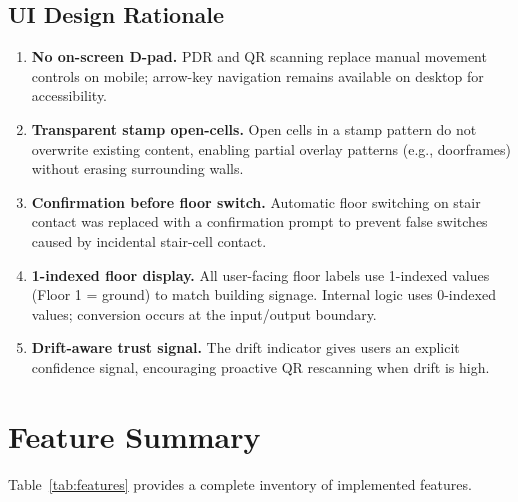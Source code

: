 \documentclass[12pt,a4paper]{article}
\begin{document}
\subsection{UI Design Rationale}

\begin{enumerate}[label=\textbf{D\arabic*.}, leftmargin=2cm, noitemsep]
  \item \textbf{No on-screen D-pad.} PDR and QR scanning replace manual
    movement controls on mobile; arrow-key navigation remains available on
    desktop for accessibility.

  \item \textbf{Transparent stamp open-cells.} Open cells in a stamp pattern
    do not overwrite existing content, enabling partial overlay patterns
    (e.g., doorframes) without erasing surrounding walls.

  \item \textbf{Confirmation before floor switch.} Automatic floor switching
    on stair contact was replaced with a confirmation prompt to prevent false
    switches caused by incidental stair-cell contact.

  \item \textbf{1-indexed floor display.} All user-facing floor labels use
    1-indexed values (Floor 1 = ground) to match building signage. Internal
    logic uses 0-indexed values; conversion occurs at the input/output boundary.

  \item \textbf{Drift-aware trust signal.} The drift indicator gives users an
    explicit confidence signal, encouraging proactive QR rescanning when drift
    is high.
\end{enumerate}

\section{Feature Summary}
\label{sec:features}

Table~\ref{tab:features} provides a complete inventory of implemented features.
\end{document}
